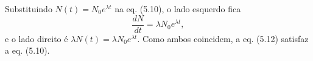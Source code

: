 Substituindo $N(t)=N_{0}e^{\lambda t}$ na eq. (5.10), o lado esquerdo fica
\[\frac{dN}{dt}=\lambda N_{0}e^{\lambda t},\]
e o lado direito é $\lambda N(t)=\lambda N_{0}e^{\lambda t}$. Como ambos coincidem, a eq. (5.12) satisfaz a eq. (5.10).